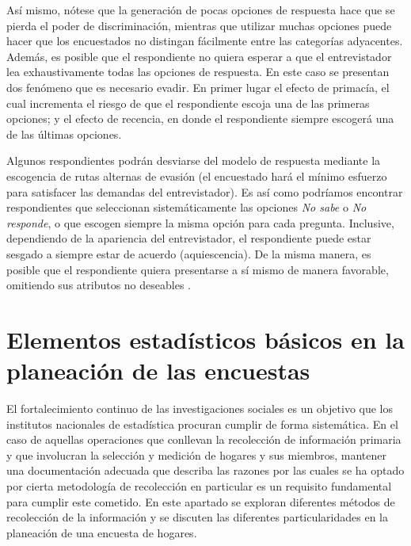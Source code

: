 \documentclass[
  12pt,
]{book}
\begin{document}
Así mismo, nótese que la generación de pocas opciones de respuesta hace que se pierda el poder de discriminación, mientras que utilizar muchas opciones puede hacer que los encuestados no distingan fácilmente entre las categorías adyacentes. Además, es posible que el respondiente no quiera esperar a que el entrevistador lea exhaustivamente todas las opciones de respuesta. En este caso se presentan dos fenómeno que es necesario evadir. En primer lugar el efecto de primacía, el cual incrementa el riesgo de que el respondiente escoja una de las primeras opciones; y el efecto de recencia, en donde el respondiente siempre escogerá una de las últimas opciones.

Algunos respondientes podrán desviarse del modelo de respuesta mediante la escogencia de rutas alternas de evasión (el encuestado hará el mínimo esfuerzo para satisfacer las demandas del entrevistador). Es así como podríamos encontrar respondientes que seleccionan sistemáticamente las opciones \emph{No sabe} o \emph{No responde}, o que escogen siempre la misma opción para cada pregunta. Inclusive, dependiendo de la apariencia del entrevistador, el respondiente puede estar sesgado a siempre estar de acuerdo (aquiescencia). De la misma manera, es posible que el respondiente quiera presentarse a sí mismo de manera favorable, omitiendo sus atributos no deseables \citep{Groves_Fowler_Couper_Lepkowski_Singer_Tourangeau_2009}.

\hypertarget{elementos-estaduxedsticos-buxe1sicos-en-la-planeaciuxf3n-de-las-encuestas}{%
\chapter{Elementos estadísticos básicos en la planeación de las encuestas}\label{elementos-estaduxedsticos-buxe1sicos-en-la-planeaciuxf3n-de-las-encuestas}}

El fortalecimiento continuo de las investigaciones sociales es un objetivo que los institutos nacionales de estadística procuran cumplir de forma sistemática. En el caso de aquellas operaciones que conllevan la recolección de información primaria y que involucran la selección y medición de hogares y sus miembros, mantener una documentación adecuada que describa las razones por las cuales se ha optado por cierta metodología de recolección en particular es un requisito fundamental para cumplir este cometido. En este apartado se exploran diferentes métodos de recolección de la información y se discuten las diferentes particularidades en la planeación de una encuesta de hogares.
\end{document}
